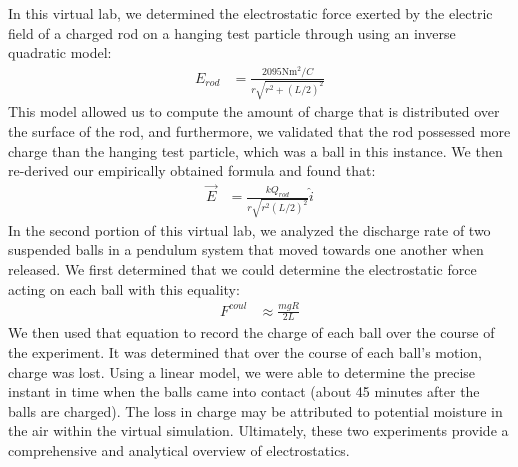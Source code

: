 \documentclass[oneside,12pt]{amsart}
\begin{document}
In this virtual lab, we determined the electrostatic force exerted by the electric field of a charged rod on a hanging test particle through using an inverse quadratic model:
\begin{align*}
E_{rod} &= \frac{2095\text{Nm}^2/C}{r\sqrt{r^2+(L/2)^2}}
\end{align*}
	This model allowed us to compute the amount of charge that is distributed over the surface of the rod, and furthermore, we validated that the rod possessed more charge than the hanging test particle, which was a ball in this instance. We then re-derived our empirically obtained formula and found that:
\begin{align*}
	\vec{E} &=  \frac{kQ_{rod}}{r\sqrt{r^2(L/2)^2}}\hat{i}
\end{align*}
	In the second portion of this virtual lab, we analyzed the discharge rate of two suspended balls in a pendulum system that moved towards one another when released. We first determined that we could determine the electrostatic force acting on each ball with this equality:
\begin{align*}
	F^{coul} &\approx \frac{mgR}{2L}
\end{align*}
  We then used that equation to record the charge of each ball over the course of the experiment. It was determined that over the course of each ball’s motion, charge was lost. Using a linear model, we were able to determine the precise instant in time when the balls came into contact (about 45 minutes after the balls are charged). The loss in charge may be attributed to potential moisture in the air within the virtual simulation. Ultimately, these two experiments provide a comprehensive and analytical overview of electrostatics. 
\newpage
\printbibliography
\end{document}
